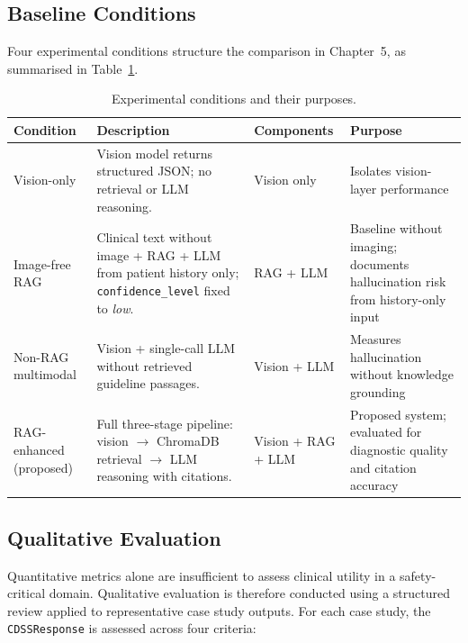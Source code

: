 \documentclass[12pt,a4paper]{report}
\begin{document}
	\subsection{Baseline Conditions}
	\label{subsec:baselines}
	
	Four experimental conditions structure the comparison in Chapter~5, as
	summarised in Table~\ref{tab:baselines}.
	
	\begin{table}[H]
		\centering
		\caption{Experimental conditions and their purposes.}
		\label{tab:baselines}
		\small
		\renewcommand{\arraystretch}{1.3}
		\begin{tabularx}{\textwidth}{@{}l X l X@{}}
			\toprule
			\textbf{Condition} & \textbf{Description} & \textbf{Components} & \textbf{Purpose} \\
			\midrule
			Vision-only
			& Vision model returns structured JSON; no retrieval or LLM reasoning.
			& Vision only
			& Isolates vision-layer performance \\[4pt]
			Image-free RAG
			& Clinical text without image + RAG + LLM from patient
			history only; \texttt{confidence\_level} fixed to \textit{low}.
			& RAG + LLM
			& Baseline without imaging; documents hallucination risk from history-only input \\[4pt]
			Non-RAG multimodal
			& Vision + single-call LLM without retrieved guideline passages.
			& Vision + LLM
			& Measures hallucination without knowledge grounding \\[4pt]
			RAG-enhanced (proposed)
			& Full three-stage pipeline: vision $\rightarrow$ ChromaDB retrieval
			$\rightarrow$ LLM reasoning with citations.
			& Vision + RAG + LLM
			& Proposed system; evaluated for diagnostic quality and citation accuracy \\
			\bottomrule
		\end{tabularx}
	\end{table}
	
	\subsection{Qualitative Evaluation}
	\label{subsec:qualitative}
	
	Quantitative metrics alone are insufficient to assess clinical utility
	in a safety-critical domain.  Qualitative evaluation is therefore
	conducted using a structured review applied to representative case study
	outputs.  For each case study, the \texttt{CDSSResponse} is assessed
	across four criteria:
	
\end{document}
